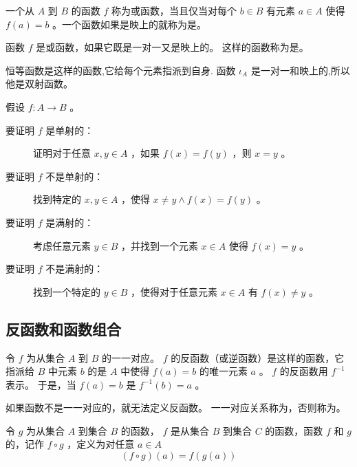 {{        \begin{defines}
            一个从 $A$ 到 $B$ 的函数 $f$ 称为或函数，当且仅当对每个 $b \in B$ 有元素 $a \in A$ 使得 $f(a) = b$ 。一个函数如果是映上的就称为是。
        \end{defines}

        \begin{defines}
            函数 $f$ 是或函数，如果它既是一对一又是映上的。
            这样的函数称为是。
        \end{defines}

        恒等函数是这样的函数,它给每个元素指派到自身.
        函数 $\iota_A$ 是一对一和映上的,所以他是双射函数。

        假设 $f : A \rightarrow B$ 。

        \begin{description}
            \item[要证明 $f$ 是单射的：] 证明对于任意 $x, y \in A$ ，如果 $f(x) = f(y)$ ，则 $x = y$ 。
            \item[要证明 $f$ 不是单射的：] 找到特定的 $x, y \in A$ ，使得 $x \neq y \wedge f(x) = f(y)$ 。
            \item[要证明 $f$ 是满射的：] 考虑任意元素 $y \in B$ ，并找到一个元素 $x \in A$ 使得 $f(x) = y$ 。
            \item[要证明 $f$ 不是满射的：] 找到一个特定的 $y \in B$ ，使得对于任意元素 $x \in A$ 有 $f(x) \neq y$ 。
        \end{description}
    }

    \subsection{反函数和函数组合}
    {
        \begin{defines}
            令 $f$ 为从集合 $A$ 到 $B$ 的一一对应。
            $f$ 的反函数（或逆函数）是这样的函数，它指派给 $B$ 中元素 $b$ 的是 $A$ 中使得 $f(a) = b$ 的唯一元素 $a$ 。
            $f$ 的反函数用 $f^{-1}$ 表示。
            于是，当 $f(a) = b$ 是 $f^{-1}(b) = a$ 。
        \end{defines}

        如果函数不是一一对应的，就无法定义反函数。
        一一对应关系称为，否则称为。

        \begin{defines}
            令 $g$ 为从集合 $A$ 到集合 $B$ 的函数， $f$ 是从集合 $B$ 到集合 $C$ 的函数，函数 $f$ 和 $g$ 的，记作 $f \circ g$ ，定义为对任意 $a \in A$
            $$(f \circ g)(a) = f(g(a))$$
        \end{defines}

}}
